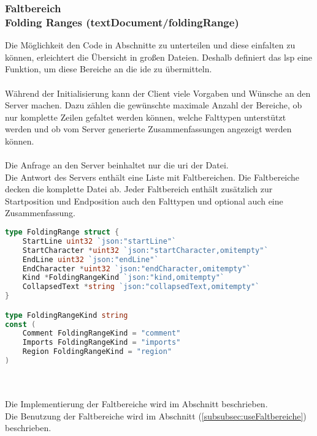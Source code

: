 \documentclass[./einleitung.tex]{subfiles}
\begin{document}
    \subsubsection[Faltbereich]{Faltbereich\\ {\textnormal{\footnotesize Folding Ranges (textDocument/foldingRange) \cite{folding}}}}\label{subsubsec:folding}
    Die Möglichkeit den Code in Abschnitte zu unterteilen und diese einfalten zu können, erleichtert die Übersicht in großen Dateien.
    Deshalb definiert das \acrshort{lsp} eine Funktion, um diese Bereiche an die \acrshort{ide} zu übermitteln.
    \\\\
    Während der Initialisierung kann der Client viele Vorgaben und Wünsche an den Server machen.
    Dazu zählen die gewünschte maximale Anzahl der Bereiche,
    ob nur komplette Zeilen gefaltet werden können,
    welche Falttypen unterstützt werden und ob vom Server generierte Zusammenfassungen angezeigt werden können.
    \\\\
    Die Anfrage an den Server beinhaltet nur die \acrshort{uri} der Datei.\\
    Die Antwort des Servers enthält eine Liste mit Faltbereichen.
    Die Faltbereiche decken die komplette Datei ab.
    Jeder Faltbereich enthält zusätzlich zur Startposition und Endposition auch den Falttypen und optional auch eine Zusammenfassung.
    \begin{lstlisting}[language=Go, caption=Definition eines Faltbereichs, label=lst:faltbereich]
type FoldingRange struct {
	StartLine uint32 `json:"startLine"`
	StartCharacter *uint32 `json:"startCharacter,omitempty"`
	EndLine uint32 `json:"endLine"`
	EndCharacter *uint32 `json:"endCharacter,omitempty"`
	Kind *FoldingRangeKind `json:"kind,omitempty"`
	CollapsedText *string `json:"collapsedText,omitempty"`
}

type FoldingRangeKind string
const (
	Comment FoldingRangeKind = "comment"
	Imports FoldingRangeKind = "imports"
	Region FoldingRangeKind = "region"
)
    \end{lstlisting}
    \\\\
    Die Implementierung der Faltbereiche wird im Abschnitt  beschrieben.\\
    Die Benutzung der Faltbereiche wird im Abschnitt  (\ref{subsubsec:useFaltbereiche}) beschrieben.
\end{document}
